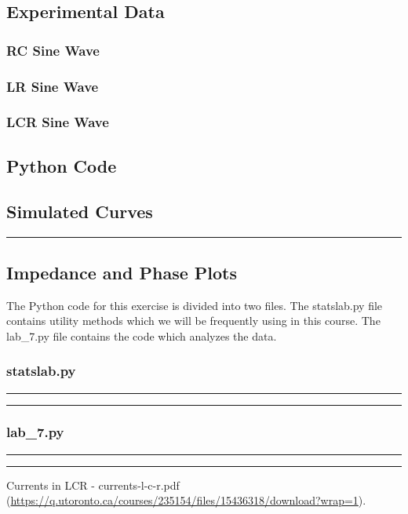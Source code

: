 \documentclass[a4paper,12pt]{article}
\begin{document}
\pagebreak

\subsection{Experimental Data}

\subsubsection{RC Sine Wave}


\subsubsection{LR Sine Wave}


\subsubsection{LCR Sine Wave}


\pagebreak

\subsection{Python Code}

\subsection{Simulated Curves}


\noindent\rule{\textwidth}{1pt}

\pagebreak

\subsection{Impedance and Phase Plots}

The Python code for this exercise is divided into two files. The statslab.py file contains utility methods
which we will be frequently using in this course. The lab\_7.py file contains the code which analyzes
the data.

\subsubsection{statslab.py}
\noindent\rule{\textwidth}{1pt}

\noindent\rule{\textwidth}{1pt}

\pagebreak

\subsubsection{lab\_7.py}
\noindent\rule{\textwidth}{1pt}

\noindent\rule{\textwidth}{1pt}


\pagebreak

\begin{thebibliography}{99}

 Currents in LCR - currents-l-c-r.pdf (\url{https://q.utoronto.ca/courses/235154/files/15436318/download?wrap=1}).

\end{thebibliography}
\end{document}
